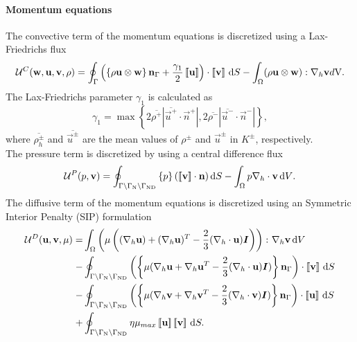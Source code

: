 \paragraph{Momentum equations}
The convective term of the momentum equations is discretized using a Lax-Friedrichs flux
\begin{equation}
\mathcal{U}^C(\textbf{w},\textbf{u},\textbf{v}, \rho)=  \oint_{\Gamma}{\left( \left\{{\rho\textbf{u}\otimes\textbf{w} }\right\}\textbf{n}_\Gamma + \frac{\gamma_1}{2}\left[\!\left[{{\textbf{u}}}\right]\!\right]\right)\cdot\left[\!\left[{{\textbf{v}}}\right]\!\right] \,\mathrm{d} S} 
-\int_{\Omega}({\rho\textbf{u}\otimes\textbf{w}}):\nabla_h\textbf{v} d\text{V}.
\label{eq:Mom_convective}\\
\end{equation}
The Lax-Friedrichs parameter $\gamma_1$ is calculated as \cite{kleinHighorderDiscontinuousGalerkin2016}
\begin{equation}
\gamma_1  = \max \left\{2 \overline{\rho^+} |\overline{\vec{u}^+} \cdot \vec{n}^+|,2 \overline{\rho^-} |\overline{\vec{u}^-} \cdot \vec{n}^-|\right\},
\label{eq:vardens_lambda}
\end{equation}
where $\overline{\rho_{h}^\pm}$ and $\overline{\vec{u}^\pm}$ are the mean values of $\rho^\pm$ and $\vec{u}^\pm$ in $K^\pm$, respectively.\\
The pressure term is discretized by using a central difference flux
\begin{equation}
\mathcal{U}^P(p,\textbf{v})=  \oint_{\Gamma \setminus \Gamma_{\text{N}}\setminus \Gamma_{\text{ND}}}{ \left\{{p}\right\}(\left[\!\left[{{\textbf{v}}}\right]\!\right]\cdot \textbf{n} )\,\mathrm{d} S} 
- \int_{\Omega}{p \nabla_h \cdot \textbf{v} \,\mathrm{d} V}. \label{eq:Mom_pressure}
\end{equation}
The diffusive term of the momentum equations is discretized using an Symmetric Interior Penalty (SIP)  formulation \cite{shahbaziExplicitExpressionPenalty2005}
\begin{equation}
\begin{aligned}	
\mathcal{U}^D(\vec{u},\vec{v},\mu) =  
&\int_{\Omega}{\left(\mu\left((\nabla_h \vec{u}) + (\nabla_h \vec{u})^T - \frac{2}{3}(\nabla_h\cdot \vec{u})\mytensor{I} \right)\right)\colon \nabla_h\vec{v}} \dV\\ 
- & \oint_{\Gamma \setminus \Gamma_{\text{N}}\setminus \Gamma_{\text{ND}}}
\left(\mean{\mu(\nabla_h\vec{u} + \nabla_h\vec{u}^T - \frac{2}{3}(\nabla_h\cdot \vec{u})\mytensor{I})}\normalBoundary\right)\cdot\jump{\vec{v}}\dS\\
- & \oint_{\Gamma \setminus \Gamma_{\text{N}}\setminus \Gamma_{\text{ND}}}
\left(\mean{\mu(\nabla_h\vec{v} + \nabla_h\vec{v}^T - \frac{2}{3}(\nabla_h\cdot \vec{v})\mytensor{I})}\normalBoundary\right)\cdot\jump{\vec{u}} \dS\\
+ &  \oint_{\Gamma \setminus \Gamma_{\text{N}}\setminus \Gamma_{\text{ND}}} \eta \mu_{max} \jump{\vec{u}} \jump{\vec{v}}\dS.
\label{eq:Mom_diffusive}
\end{aligned}
\end{equation}
